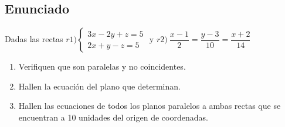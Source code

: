 \subsection{Enunciado}
\noindent Dadas las rectas $r1)
	\begin{cases}
		3x - 2y + z = 5 \\
		2x + y - z = 5
	\end{cases}$
y $r2) \ \dfrac{x - 1}{2} = \dfrac{y - 3}{10} = \dfrac{x + 2}{14}$

\begin{enumerate}
	\item Verifiquen que son paralelas y no coincidentes.
	\item Hallen la ecuación del plano que determinan.
	\item Hallen las ecuaciones de todos los planos paralelos a ambas rectas que se encuentran a 10 unidades del origen de coordenadas.
\end{enumerate}
